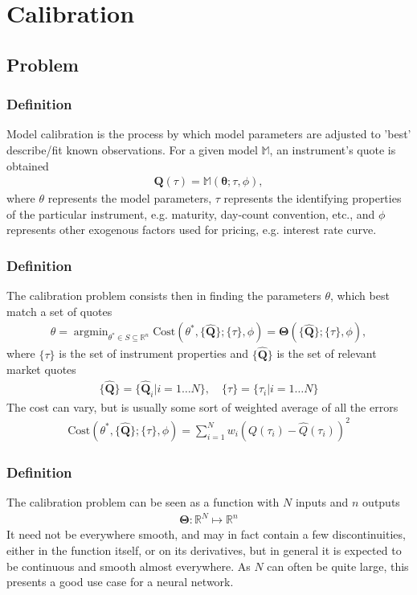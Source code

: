\documentclass[bigger]{beamer}
\DeclareMathOperator*{\argmin}{argmin}
\begin{document}
\section{Calibration}
\subsection{Problem}
\begin{frame}
\frametitle{Definition} 
  \justifying
Model calibration is the process by which model parameters are adjusted to 'best' describe/fit known observations. For a given model $\mathbb{M}$, an instrument's quote is obtained
\begin{align*}
\mathbf{Q}(\tau) = \mathbb{M}(\mathbf{\theta}; \tau, \phi),
\end{align*}
where $\theta$ represents the model parameters, $\tau$ represents the identifying properties of the particular instrument, e.g. maturity, day-count convention, etc., and $\phi$ represents other exogenous factors used for pricing, e.g. interest rate curve. 
\end{frame}

\begin{frame}
\frametitle{Definition} 
  \justifying
The calibration problem consists then in finding the parameters $\theta$, which best match a set of quotes
\begin{align*}
\theta = \argmin_{\theta^* \in S \subseteq \mathbb{R}^n}
\text{Cost}\left(\theta^*, \lbrace \hat{\mathbf{Q}} \rbrace; \lbrace \tau \rbrace, \phi\right)
= \bm{\Theta}\left(\lbrace \hat{\mathbf{Q}} \rbrace; \lbrace \tau \rbrace, \phi \right),
\end{align*}
where $\lbrace \tau \rbrace$ is the set of instrument properties and $\lbrace \hat{\mathbf{Q}} \rbrace$ is the set of relevant market quotes
\begin{align*}
\lbrace \hat{\mathbf{Q}} \rbrace = \lbrace \hat{\mathbf{Q}}_i \vert i = 1\ldots N \rbrace, \quad
\lbrace \tau \rbrace = \lbrace \tau_i \vert i = 1\ldots N \rbrace
\end{align*}
The cost can vary, but is usually some sort of weighted average of all the errors
\begin{align*}
\text{Cost}\left(\theta^*, \lbrace \hat{\mathbf{Q}} \rbrace; \lbrace \tau \rbrace, \phi\right)=
\sum_{i = 1}^N w_i (Q(\tau_i) - \hat{Q}(\tau_i))^2
\end{align*}
\end{frame}

\begin{frame}
\frametitle{Definition} 
  \justifying
The calibration problem can be seen as a function with $N$ inputs and $n$ outputs
\begin{align*}
\bm{\Theta} : \mathbb{R}^N \mapsto \mathbb{R}^n
\end{align*}
It need not be everywhere smooth, and may in fact contain a few discontinuities, either in the function itself, or on its derivatives, but in general it is expected to be continuous and smooth almost everywhere. As $N$ can often be quite large, this presents a good use case for a neural network. 
\end{frame}
\end{document}

